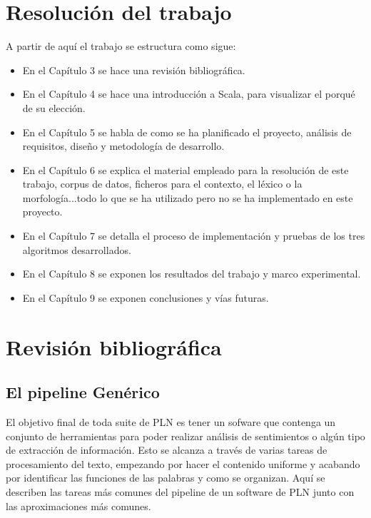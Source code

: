 \chapter*{Resolución del trabajo}
A partir de aquí el trabajo se estructura como sigue:
\begin{itemize}
\item En el \textcolor{SchoolColor}{Capítulo 3} se hace una revisión bibliográfica.
\item En el \textcolor{SchoolColor}{Capítulo 4} se hace una introducción a Scala, para visualizar el porqué de su elección.
\item En el \textcolor{SchoolColor}{Capítulo 5} se habla de como se ha planificado el proyecto, análisis de requisitos, diseño y metodología de desarrollo. 
\item En el \textcolor{SchoolColor}{Capítulo 6} se explica el material empleado para la resolución de este trabajo, corpus de datos, ficheros para el contexto, el léxico o la morfología...todo lo que se ha utilizado pero no se ha implementado en este proyecto.
\item En el \textcolor{SchoolColor}{Capítulo 7} se detalla el proceso de implementación y pruebas de los tres algoritmos desarrollados.
\item En el \textcolor{SchoolColor}{Capítulo 8} se exponen los resultados del trabajo y marco experimental.
\item En el \textcolor{SchoolColor}{Capítulo 9} se exponen conclusiones y vías futuras.
\end{itemize}
\chapter{Revisión bibliográfica}
\section{El pipeline Genérico}
El objetivo final de toda suite de PLN es tener un sofware que contenga un conjunto de herramientas para poder realizar análisis de sentimientos o algún tipo de extracción de información. Esto se alcanza a través de varias tareas de procesamiento del texto, empezando por hacer el contenido uniforme y acabando por identificar las funciones de las palabras y como se organizan. Aquí se describen las tareas más comunes del pipeline de un software de PLN junto con las aproximaciones más comunes. \newline
